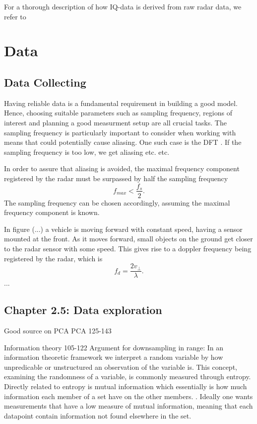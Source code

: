 \documentclass[a4paper, 12pt]{article}
\begin{document}
For a thorough description of how IQ-data is derived from raw radar data, we refer to \citep{richards_2014}

\section{Data}
\subsection{Data Collecting}
Having reliable data is a fundamental requirement in building a good model. Hence, choosing suitable parameters such as sampling frequency, regions of interest and planning a good measurment setup are all crucial tasks. The sampling frequency is particularly important to consider when working with means that could potentially cause aliasing. One such case is the DFT \citep{lindgren_rootzeŽn_sandsten_2013}. If the sampling frequency is too low, we get aliasing etc. etc. 

In order to assure that aliasing is avoided, the maximal frequency component registered by the radar must be surpassed by half the sampling frequency
\begin{equation}
	f_{max} < \frac{f_s}{2}.
\end{equation}
The sampling frequency can be chosen accordingly, assuming the maximal frequency component is known. 

In figure (...) a vehicle is moving forward with constant speed, having a sensor mounted at the front. As it moves forward, small objects on the ground get closer to the radar sensor with some speed. This gives rise to a doppler frequency being registered by the radar, which is \citep{lien_gillian_karagozler_amihood_schwesig_olson_raja_poupyrev_2016}
\begin{equation}
	f_{d} = \frac{2v_\perp}{\lambda}.
\end{equation}
...


\subsection{Chapter 2.5: Data exploration}

Good source on PCA
\cite{hyvasrinen_karhunen_oja_2004}
PCA 125-143

Information theory
105-122
Argument for downsampling in range: In an information theoretic framework we interpret a random variable by how unpredicable or unstructured an observation of the variable is. This concept, examining the randomness of a variable, is commonly measured through entropy. Directly related to entropy is mutual information which essentially is how much information each member of a set have on the other members. \cite{hyvasrinen_karhunen_oja_2004}. Ideally one wants measurements that have a low measure of mutual information, meaning that each datapoint contain information not found elsewhere in the set. 
\end{document}
